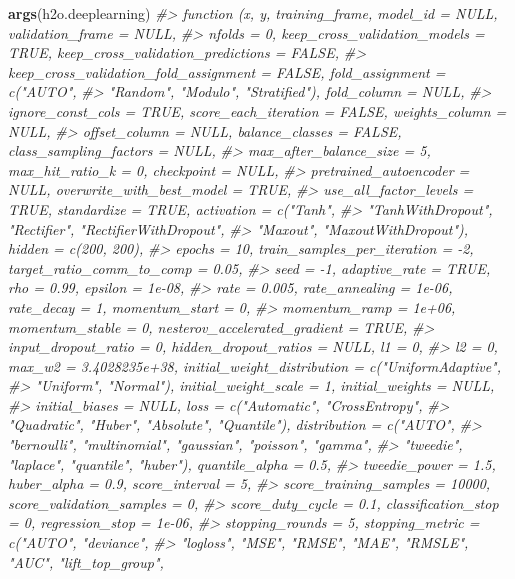 \documentclass[]{book}
\newenvironment{Shaded}{\begin{snugshade}}{\end{snugshade}}
\newcommand{\CommentTok}[1]{\textcolor[rgb]{0.56,0.35,0.01}{\textit{#1}}}
\newcommand{\KeywordTok}[1]{\textcolor[rgb]{0.13,0.29,0.53}{\textbf{#1}}}
\newcommand{\NormalTok}[1]{#1}
\begin{document}
\begin{Shaded}
\begin{Highlighting}[]
\KeywordTok{args}\NormalTok{(h2o.deeplearning)}
\CommentTok{#> function (x, y, training_frame, model_id = NULL, validation_frame = NULL, }
\CommentTok{#>     nfolds = 0, keep_cross_validation_models = TRUE, keep_cross_validation_predictions = FALSE, }
\CommentTok{#>     keep_cross_validation_fold_assignment = FALSE, fold_assignment = c("AUTO", }
\CommentTok{#>         "Random", "Modulo", "Stratified"), fold_column = NULL, }
\CommentTok{#>     ignore_const_cols = TRUE, score_each_iteration = FALSE, weights_column = NULL, }
\CommentTok{#>     offset_column = NULL, balance_classes = FALSE, class_sampling_factors = NULL, }
\CommentTok{#>     max_after_balance_size = 5, max_hit_ratio_k = 0, checkpoint = NULL, }
\CommentTok{#>     pretrained_autoencoder = NULL, overwrite_with_best_model = TRUE, }
\CommentTok{#>     use_all_factor_levels = TRUE, standardize = TRUE, activation = c("Tanh", }
\CommentTok{#>         "TanhWithDropout", "Rectifier", "RectifierWithDropout", }
\CommentTok{#>         "Maxout", "MaxoutWithDropout"), hidden = c(200, 200), }
\CommentTok{#>     epochs = 10, train_samples_per_iteration = -2, target_ratio_comm_to_comp = 0.05, }
\CommentTok{#>     seed = -1, adaptive_rate = TRUE, rho = 0.99, epsilon = 1e-08, }
\CommentTok{#>     rate = 0.005, rate_annealing = 1e-06, rate_decay = 1, momentum_start = 0, }
\CommentTok{#>     momentum_ramp = 1e+06, momentum_stable = 0, nesterov_accelerated_gradient = TRUE, }
\CommentTok{#>     input_dropout_ratio = 0, hidden_dropout_ratios = NULL, l1 = 0, }
\CommentTok{#>     l2 = 0, max_w2 = 3.4028235e+38, initial_weight_distribution = c("UniformAdaptive", }
\CommentTok{#>         "Uniform", "Normal"), initial_weight_scale = 1, initial_weights = NULL, }
\CommentTok{#>     initial_biases = NULL, loss = c("Automatic", "CrossEntropy", }
\CommentTok{#>         "Quadratic", "Huber", "Absolute", "Quantile"), distribution = c("AUTO", }
\CommentTok{#>         "bernoulli", "multinomial", "gaussian", "poisson", "gamma", }
\CommentTok{#>         "tweedie", "laplace", "quantile", "huber"), quantile_alpha = 0.5, }
\CommentTok{#>     tweedie_power = 1.5, huber_alpha = 0.9, score_interval = 5, }
\CommentTok{#>     score_training_samples = 10000, score_validation_samples = 0, }
\CommentTok{#>     score_duty_cycle = 0.1, classification_stop = 0, regression_stop = 1e-06, }
\CommentTok{#>     stopping_rounds = 5, stopping_metric = c("AUTO", "deviance", }
\CommentTok{#>         "logloss", "MSE", "RMSE", "MAE", "RMSLE", "AUC", "lift_top_group", }

\end{Highlighting}
\end{Shaded}
\end{document}
